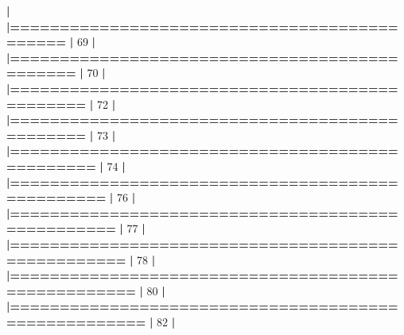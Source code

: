 \documentclass[]{book}
\newenvironment{Shaded}{\begin{snugshade}}{\end{snugshade}}
\newcommand{\DecValTok}[1]{\textcolor[rgb]{0.00,0.00,0.81}{#1}}
\newcommand{\ErrorTok}[1]{\textcolor[rgb]{0.64,0.00,0.00}{\textbf{#1}}}
\newcommand{\NormalTok}[1]{#1}
\newcommand{\OperatorTok}[1]{\textcolor[rgb]{0.81,0.36,0.00}{\textbf{#1}}}
\newcommand{\StringTok}[1]{\textcolor[rgb]{0.31,0.60,0.02}{#1}}
\begin{document}
\begin{Shaded}
\begin{Highlighting}[]
{{{{{{{{{{{{{{{{{{{{{{{{{{{{{{{{{{{{{{{{{{{{{{{{{{  \OperatorTok{|}\StringTok{                                                                       }
\StringTok{  }\ErrorTok{|=============================================}\StringTok{                    }\ErrorTok{|}\StringTok{  }\DecValTok{69}\NormalTok{%}
  \OperatorTok{|}\StringTok{                                                                       }
\StringTok{  }\ErrorTok{|==============================================}\StringTok{                   }\ErrorTok{|}\StringTok{  }\DecValTok{70}\NormalTok{%}
  \OperatorTok{|}\StringTok{                                                                       }
\StringTok{  }\ErrorTok{|===============================================}\StringTok{                  }\ErrorTok{|}\StringTok{  }\DecValTok{72}\NormalTok{%}
  \OperatorTok{|}\StringTok{                                                                       }
\StringTok{  }\ErrorTok{|===============================================}\StringTok{                  }\ErrorTok{|}\StringTok{  }\DecValTok{73}\NormalTok{%}
  \OperatorTok{|}\StringTok{                                                                       }
\StringTok{  }\ErrorTok{|================================================}\StringTok{                 }\ErrorTok{|}\StringTok{  }\DecValTok{74}\NormalTok{%}
  \OperatorTok{|}\StringTok{                                                                       }
\StringTok{  }\ErrorTok{|=================================================}\StringTok{                }\ErrorTok{|}\StringTok{  }\DecValTok{76}\NormalTok{%}
  \OperatorTok{|}\StringTok{                                                                       }
\StringTok{  }\ErrorTok{|==================================================}\StringTok{               }\ErrorTok{|}\StringTok{  }\DecValTok{77}\NormalTok{%}
  \OperatorTok{|}\StringTok{                                                                       }
\StringTok{  }\ErrorTok{|===================================================}\StringTok{              }\ErrorTok{|}\StringTok{  }\DecValTok{78}\NormalTok{%}
  \OperatorTok{|}\StringTok{                                                                       }
\StringTok{  }\ErrorTok{|====================================================}\StringTok{             }\ErrorTok{|}\StringTok{  }\DecValTok{80}\NormalTok{%}
  \OperatorTok{|}\StringTok{                                                                       }
\StringTok{  }\ErrorTok{|=====================================================}\StringTok{            }\ErrorTok{|}\StringTok{  }\DecValTok{82}\NormalTok{%}
  \OperatorTok{|}\StringTok{                                                                       }
}}}}}}}}}}}}}}}}}}}}}}}}}}}}}}}}}}}}}}}}}}}}}}}}}}}}}}}}}}}}
\end{Highlighting}
\end{Shaded}
\end{document}
